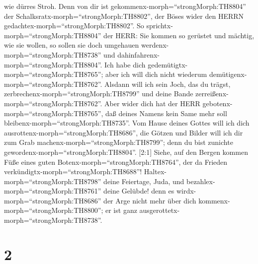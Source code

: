 wie dürres Stroh.  Denn von dir ist
gekommenx-morph=``strongMorph:TH8804'' der
Schalksratx-morph=``strongMorph:TH8802'', der Böses wider den HERRN
gedachtex-morph=``strongMorph:TH8802''.  So
sprichtx-morph=``strongMorph:TH8804'' der HERR: Sie kommen so gerüstet
und mächtig, wie sie wollen, so sollen sie doch umgehauen
werdenx-morph=``strongMorph:TH8738'' und
dahinfahrenx-morph=``strongMorph:TH8804''. Ich habe dich
gedemütigtx-morph=``strongMorph:TH8765''; aber ich will dich nicht
wiederum demütigenx-morph=``strongMorph:TH8762''.  Alsdann
will ich sein Joch, das du trägst,
zerbrechenx-morph=``strongMorph:TH8799'' und deine Bande
zerreißenx-morph=``strongMorph:TH8762''.  Aber wider dich
hat der HERR gebotenx-morph=``strongMorph:TH8765'', daß deines Namens
kein Same mehr soll bleibenx-morph=``strongMorph:TH8735''. Vom Hause
deines Gottes will ich dich ausrottenx-morph=``strongMorph:TH8686'', die
Götzen und Bilder will ich dir zum Grab
machenx-morph=``strongMorph:TH8799''; denn du bist zunichte
gewordenx-morph=``strongMorph:TH8804''.  {[}2:1{]} Siehe,
auf den Bergen kommen Füße eines guten
Botenx-morph=``strongMorph:TH8764'', der da Frieden
verkündigtx-morph=``strongMorph:TH8688''!
Haltex-morph=``strongMorph:TH8798'' deine Feiertage, Juda, und
bezahlex-morph=``strongMorph:TH8761'' deine Gelübde! denn es
wirdx-morph=``strongMorph:TH8686'' der Arge nicht mehr über dich
kommenx-morph=``strongMorph:TH8800''; er ist ganz
ausgerottetx-morph=``strongMorph:TH8738''.

\hypertarget{section-1}{%
\section{2}\label{section-1}}

